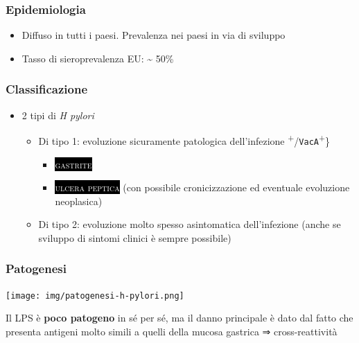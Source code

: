 \documentclass[italian,]{article}
\providecommand{\tightlist}{%
  \setlength{\itemsep}{0pt}\setlength{\parskip}{0pt}}
\newcommand{\marginnote}[1]{\marginpar{\footnotesize← \emph{#1}}}
\newcommand{\pat}[1]{\colorbox{black}{\textcolor{white}{\textsc{#1}}}}
\begin{document}
\hypertarget{epidemiologia-1}{%
\subsubsection{Epidemiologia}\label{epidemiologia-1}}

\begin{itemize}
\tightlist
\item
  Diffuso in tutti i paesi. Prevalenza nei paesi in via di sviluppo
\item
  Tasso di sieroprevalenza EU: \textasciitilde{} 50\%
\end{itemize}

\hypertarget{classificazione-1}{%
\subsubsection{Classificazione}\label{classificazione-1}}

\begin{itemize}
\tightlist
\item
  2 tipi di \emph{H pylori}

  \begin{itemize}
  \tightlist
  \item
    Di tipo 1: evoluzione sicuramente patologica dell'infezione
    \marginnote \texttt{CagA}\textsuperscript{+}/\texttt{VacA}\textsuperscript{+}\}

    \begin{itemize}
    \item
      \pat{gastrite}
    \item
      \pat{ulcera peptica} (con possibile cronicizzazione ed eventuale
      evoluzione neoplasica)
    \end{itemize}
  \item
    Di tipo 2: evoluzione molto spesso asintomatica dell'infezione
    (anche se sviluppo di sintomi clinici è sempre possibile)
  \end{itemize}
\end{itemize}

\hypertarget{patogenesi}{%
\subsubsection{Patogenesi}\label{patogenesi}}

\texttt{[image: img/patogenesi-h-pylori.png]}~

\footnotesize

Il LPS è \textbf{poco patogeno} in sé per sé, ma il danno principale è
dato dal fatto che presenta antigeni molto simili a quelli della mucosa
gastrica ⇒ cross-reattività \normalsize
\end{document}
